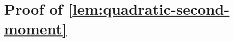 \documentclass{article}
\newcommand{\E}{\mathbb E}
\newcommand{\Pp}{\mathbb P}
\newcommand{\F}{\mathcal F}
\newcommand{\N}{\mathcal N}
\newcommand{\1}{\mathbf 1}
\begin{document}
\section{Proof of \cref{lem:quadratic-second-moment}}
\label{app:quadratic-second-moment}
\end{document}
